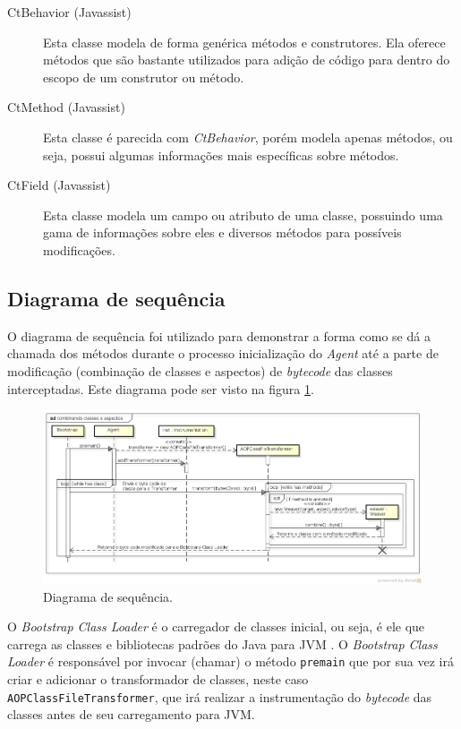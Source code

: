 \documentclass[tc,oneside]{iiufrgs}
\begin{document}
\begin{description}
\item [CtBehavior (Javassist)] Esta classe modela de forma genérica métodos e construtores. Ela oferece métodos que são bastante utilizados para adição de código para dentro do escopo de um construtor ou método.
\item [CtMethod (Javassist)] Esta classe é parecida com \textit{CtBehavior}, porém modela apenas métodos, ou seja, possui algumas informações mais específicas sobre métodos.
\item [CtField (Javassist)] Esta classe modela um campo ou atributo de uma classe, possuindo uma gama de informações sobre eles e diversos métodos para possíveis modificações.
\end{description}

\subsection{Diagrama de sequência}

O diagrama de sequência foi utilizado para demonstrar a forma como se dá a chamada dos métodos durante o processo inicialização do \textit{Agent} até a parte de modificação (combinação de classes e aspectos) de \textit{bytecode} das classes interceptadas. Este diagrama pode ser visto na figura \ref{fig:sequenciaCombinador}.

\begin{figure}[ht]
	\centering
	\includegraphics[scale=0.4]{diagramas/diagramaSequencia_Combinando.png}
	\caption{Diagrama de sequência.}
	\label{fig:sequenciaCombinador}
\end{figure}

O \textit{Bootstrap Class Loader} é o carregador de classes inicial, ou seja, é ele que carrega as classes e bibliotecas padrões do Java para JVM \cite{kalinovsky2004covert}. O \textit{Bootstrap Class Loader} é responsável por invocar (chamar) o método \texttt{premain} que por sua vez irá criar e adicionar o transformador de classes, neste caso \texttt{AOPClassFileTransformer}, que irá realizar a instrumentação do \textit{bytecode} das classes antes de seu carregamento para JVM.
\end{document}
